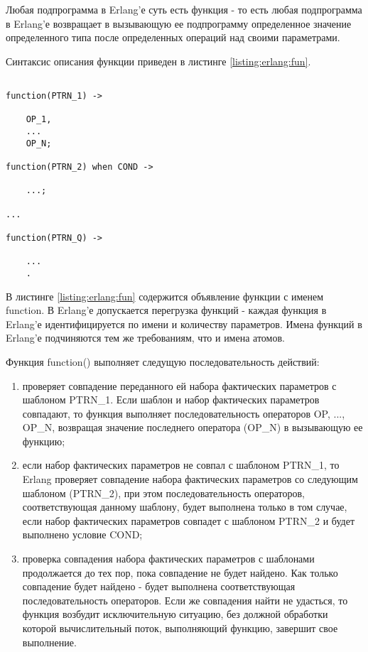 
Любая подпрограмма в Erlang'е суть есть функция - то есть любая подпрограмма в Erlang'е возвращает в вызывающую ее подпрограмму определенное значение определенного типа после определенных операций над своими параметрами.

Синтаксис описания функции приведен в листинге \ref{listing:erlang:fun}.

\begin{lstlisting}

function(PTRN_1) ->

	OP_1,
	...
	OP_N;

function(PTRN_2) when COND ->

	...;

...

function(PTRN_Q) ->

	...
	.

\end{lstlisting}
\mylistingend

В листинге \ref{listing:erlang:fun} содержится объявление функции с именем function. В Erlang'е допускается перегрузка функций - каждая функция в Erlang'е идентифицируется по имени и количеству параметров. Имена функций в Erlang'е подчиняются тем же требованиям, что и имена атомов.

Функция function() выполняет следущую последовательность действий:

\begin{enumerate}

	\item проверяет совпадение переданного ей набора фактических параметров с шаблоном PTRN\_1. Если шаблон и набор фактических параметров совпадают, то функция выполняет последовательность операторов OP, ..., OP\_N, возвращая значение последнего оператора (OP\_N) в вызывающую ее функцию;

	\item если набор фактических параметров не совпал с шаблоном \linebreak PTRN\_1, то Erlang проверяет совпадение набора фактических параметров со следующим шаблоном (PTRN\_2), при этом последовательность операторов, соответствующая данному шаблону, будет выполнена только в том случае, если набор фактических параметров совпадет с шаблоном PTRN\_2 и будет выполнено условие COND;

	\item проверка совпадения набора фактических параметров с шаблонами продолжается до тех пор, пока совпадение не будет найдено. Как только совпадение будет найдено - будет выполнена соответствующая последовательность операторов. Если же совпадения найти не удасться, то функция возбудит исключительную ситуацию, без должной обработки которой вычислительный поток, выполняющий функцию, завершит свое выполнение.

\end{enumerate}

